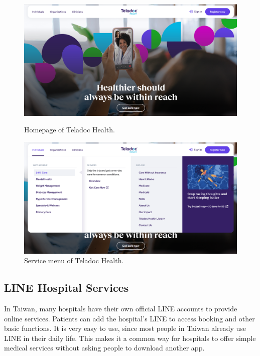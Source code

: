 \begin{figure}[htbp]
    \centering
    \begin{minipage}[b]{0.47\textwidth}
        \centering
        \includegraphics[width=\textwidth]{../../images/telodocHome.png}
        \caption{Homepage of Teladoc Health.}
        \label{fig:teladoc-home}
    \end{minipage}
    \hfill
    \begin{minipage}[b]{0.47\textwidth}
        \centering
        \includegraphics[width=\textwidth]{../../images/telodocServices.png}
        \caption{Service menu of Teladoc Health.}
        \label{fig:teladoc-services}
    \end{minipage}
\end{figure}

\subsection{LINE Hospital Services}
In Taiwan, many hospitals have their own official LINE accounts to provide online services. Patients can add the hospital’s LINE to access booking and other basic functions. It is very easy to use, since most people in Taiwan already use LINE in their daily life. This makes it a common way for hospitals to offer simple medical services without asking people to download another app.

